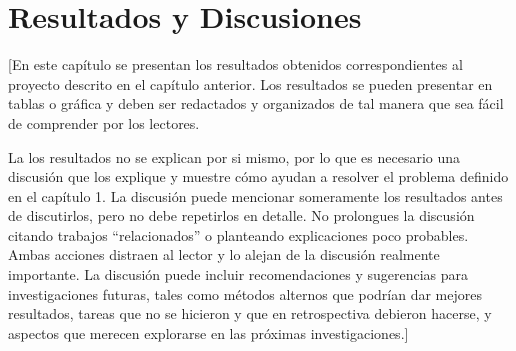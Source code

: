 \chapter{Resultados y Discusiones}
[En este capítulo se presentan los resultados obtenidos correspondientes al proyecto descrito en el capítulo anterior. Los resultados se pueden presentar en tablas o gráfica y deben ser redactados y organizados de tal manera que sea fácil de comprender por los lectores.

La los resultados no se explican por si mismo, por lo que es necesario una discusión que los explique y muestre cómo ayudan a resolver el problema definido en el capítulo 1. La discusión puede mencionar someramente los resultados antes de discutirlos, pero no debe repetirlos en detalle. No prolongues la discusión citando trabajos ``relacionados'' o planteando explicaciones poco probables. Ambas acciones distraen al lector y lo alejan de la discusión realmente importante. La discusión puede incluir recomendaciones y sugerencias para investigaciones futuras, tales como métodos alternos que podrían dar mejores resultados, tareas que no se hicieron y que en retrospectiva debieron hacerse, y aspectos que merecen explorarse en las próximas investigaciones.] 




